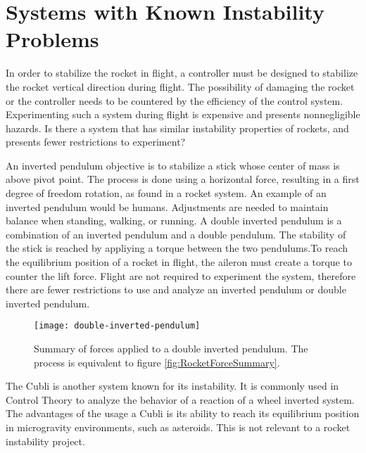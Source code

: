\section{Systems with Known Instability Problems}
\graphicspath{{figures/"Preanalysis&Requirement"/SimilarSystems/}}


In order to stabilize the rocket in flight, a controller must be designed to stabilize the rocket vertical direction during flight. The possibility of damaging the rocket or the controller needs to be countered by the efficiency of the control system. Experimenting such a system during flight is expensive and presents nonnegligible hazards.
Is there a system that has similar instability properties of rockets, and presents fewer restrictions to experiment?

An inverted pendulum objective is to stabilize a stick whose center of mass is above pivot point. The process is done using a horizontal force, resulting in a first degree of freedom rotation, as found in a rocket system. An example of an inverted pendulum would be humans. Adjustments are needed to maintain balance when standing, walking, or running. 
A double inverted pendulum is a combination of an inverted pendulum and a double pendulum. The stability of the stick is reached by appliying a torque between the two pendulums.To reach the equilibrium position of a rocket in flight, the aileron must create a torque to counter the lift force. Flight are not required to experiment the system, therefore there are fewer restrictions to use and analyze an inverted pendulum or double inverted pendulum. 

\begin{figure}[htbp]
	\centering
	\texttt{[image: double-inverted-pendulum]}
	\caption{Summary of forces applied to a double inverted pendulum. The process is equivalent to figure  \vref{fig:RocketForceSummary}.}
	\label{fig:DoubleInvertedPendulum}
\end{figure}


The Cubli is another system known for its instability. It is commonly used in Control Theory to analyze the behavior of a reaction of a wheel inverted system. The advantages of the usage a Cubli is its ability to reach its equilibrium position in microgravity environments, such as asteroids. This is not relevant to a rocket instability project.

